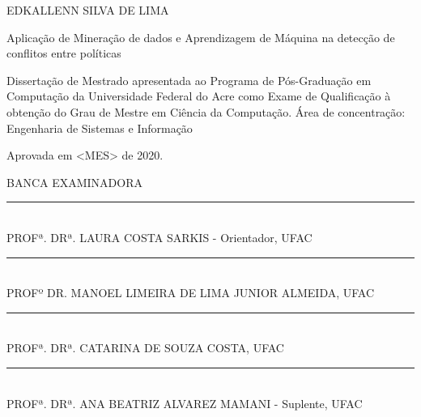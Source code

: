 \documentclass[
	12pt,				%
	openright,			%
	oneside,			%
	a4paper,			%
	english,			%
	french,				%
	spanish,			%
	brazil				%
	]{abntex2}
\begin{document}
\vspace{-60mm}

\begin{center}
	{\large EDKALLENN SILVA DE LIMA}\\
	\vspace{7mm}
	
	Aplicação de Mineração de dados e Aprendizagem de Máquina na detecção de conflitos entre políticas\\
	\vspace{10mm}
\end{center}

\noindent
\begin{flushright}
	\begin{minipage}[t]{8cm}		
		Dissertação de Mestrado apresentada ao Programa de P\'{o}s-Gradua\c{c}\~{a}o em Computa\c{c}\~{a}o da Universidade Federal do Acre como Exame de Qualificação à obten\c{c}\~{a}o do Grau de Mestre em Ciência da Computação. \'{A}rea de concentra\c{c}\~{a}o: Engenharia de Sistemas e Informação
		
	\end{minipage}
\end{flushright}
\vspace{1.0 cm}
\noindent
{Aprovada em <MES> de 2020.} \\
\begin{flushright}
	\parbox{11cm}
	{
		\begin{center}
			BANCA EXAMINADORA \\
			\vspace{6mm}
			\rule{11cm}{.1mm} \\
			PROFª. DRª. LAURA COSTA SARKIS - Orientador, UFAC \\
			\vspace{6mm}
			\rule{11cm}{.1mm} \\
			PROFº DR. MANOEL LIMEIRA DE LIMA JUNIOR ALMEIDA, UFAC\\
			\vspace{6mm}
			\rule{11cm}{.1mm} \\
			PROFª. DRª. CATARINA DE SOUZA COSTA, UFAC\\
			\vspace{4mm}
			\rule{11cm}{.1mm} \\
			PROFª. DRª. ANA BEATRIZ ALVAREZ MAMANI - Suplente, UFAC\\
			\vspace{6mm}
			
		\end{center}
	}
\end{flushright}
\end{document}
